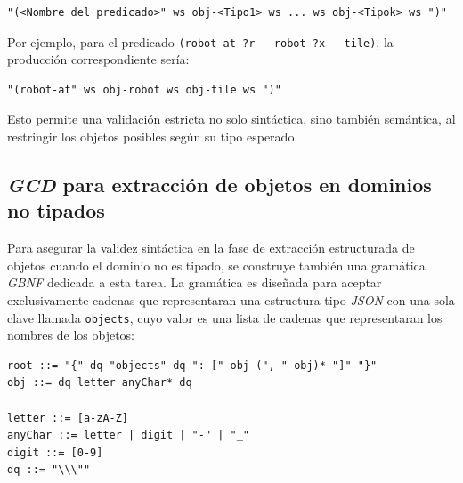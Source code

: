 \begin{tcolorbox}[colback=blue!5!white, colframe=blue!75!black, title=Plantilla por predicado (tipado), fonttitle=\bfseries, breakable]
\small
\begin{verbatim}
"(<Nombre del predicado>" ws obj-<Tipo1> ws ... ws obj-<Tipok> ws ")"
\end{verbatim}
\end{tcolorbox}

Por ejemplo, para el predicado \texttt{(robot-at ?r - robot ?x - tile)}, la producción correspondiente sería:

\begin{tcolorbox}[colback=white, colframe=gray, title=Ejemplo \texttt{atomicFormula} para predicado tipado, fonttitle=\bfseries, breakable]
\small
\begin{verbatim}
"(robot-at" ws obj-robot ws obj-tile ws ")"
\end{verbatim}
\end{tcolorbox}

Esto permite una validación estricta no solo sintáctica, sino también semántica, al restringir los objetos posibles según su tipo esperado.

\subsection{\textit{GCD} para extracción de objetos en dominios no tipados}

Para asegurar la validez sintáctica en la fase de extracción estructurada de objetos cuando el dominio no es tipado, se construye también una gramática \textit{GBNF} dedicada a esta tarea. La gramática es diseñada para aceptar exclusivamente cadenas que representaran una estructura tipo \textit{JSON} con una sola clave llamada \texttt{objects}, cuyo valor es una lista de cadenas que representaran los nombres de los objetos:

\begin{tcolorbox}[colback=blue!5!white, colframe=blue!75!black, title=Gramática para extracción de objetos (no tipado), fonttitle=\bfseries, breakable]
\small
\begin{verbatim}
root ::= "{" dq "objects" dq ": [" obj (", " obj)* "]" "}"
obj ::= dq letter anyChar* dq

letter ::= [a-zA-Z]
anyChar ::= letter | digit | "-" | "_"
digit ::= [0-9]
dq ::= "\\\""
\end{verbatim}
\end{tcolorbox}

